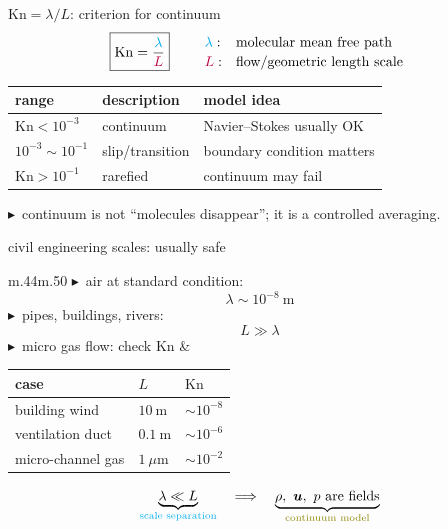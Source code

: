 \documentclass[UTF8,9pt]{ctexbeamer}
\newcommand{\uvec}{\bm{u}}
\newcommand{\Kn}{\mathrm{Kn}}
\newcommand{\cyan}[1]{{\color{cyan}#1}}
\newcommand{\olive}[1]{{\color{olive}#1}}
\newcommand{\purple}[1]{{\color{purple}#1}}
\newcommand{\btri}{\textcolor{blue!75!black}{$\blacktriangleright$}}
\begin{document}
\begin{frame}[label=kn]{$\Kn=\lambda/L$: criterion for continuum}
\[
\boxed{\displaystyle
\Kn=\frac{\cyan{\lambda}}{\purple{L}}
}
\qquad
\begin{array}{ll}
\cyan{\lambda}: & \text{molecular mean free path}\\[2pt]
\purple{L}: & \text{flow/geometric length scale}
\end{array}
\]

\vspace{.15cm}
\begin{center}
\small
\begin{tabular}{lll}
\toprule
range & description & model idea \\
\midrule
$\Kn<10^{-3}$ & continuum & Navier--Stokes usually OK \\
$10^{-3}\sim10^{-1}$ & slip/transition & boundary condition matters \\
$\Kn>10^{-1}$ & rarefied & continuum may fail \\
\bottomrule
\end{tabular}
\end{center}

\vspace{.16cm}
\small
\btri\ continuum is not ``molecules disappear''; it is a controlled averaging.
\end{frame}

\begin{frame}{civil engineering scales: usually safe}
\begin{tabular}{m{}m{}}
\small
\btri\ air at standard condition:
\[
\lambda\sim 10^{-8}\ \mathrm{m}
\]
\btri\ pipes, buildings, rivers:
\[
L\gg\lambda
\]
\btri\ micro gas flow: check $\Kn$
&
\centering
\small
\begin{tabular}{lll}
\toprule
case & $L$ & $\Kn$ \\
\midrule
building wind & $10\ \mathrm{m}$ & $\sim 10^{-8}$\\
ventilation duct & $0.1\ \mathrm{m}$ & $\sim 10^{-6}$\\
micro-channel gas & $1\ \mu\mathrm{m}$ & $\sim 10^{-2}$\\
\bottomrule
\end{tabular}
\end{tabular}

\vspace{.32cm}
\[
\underbrace{\lambda \ll L}_{\text{\cyan{scale separation}}}
\quad \Longrightarrow \quad
\underbrace{\rho,\ \uvec,\ p\ \text{are fields}}_{\text{\olive{continuum model}}}
\]
\end{frame}
\end{document}
